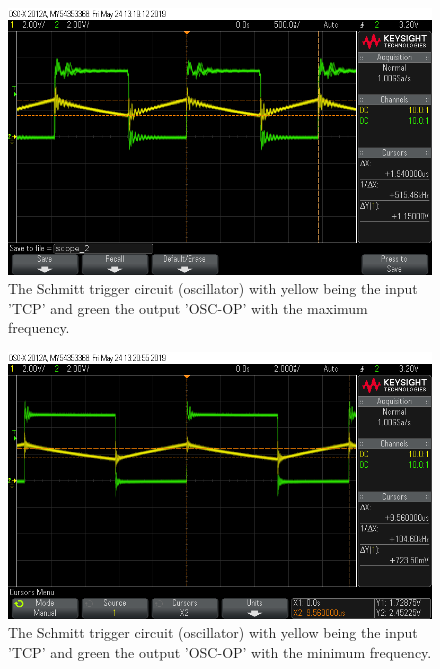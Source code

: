 \begin{figure}[H]
\centering
\includegraphics[width=.9\textwidth]{figures/scope_2.png}
\caption{The Schmitt trigger circuit (oscillator) with yellow being the input 'TCP' and green the output 'OSC-OP' with the maximum frequency.}
\label{fig:scope_2}
\end{figure}


\begin{figure}[H]
\centering
\includegraphics[width=.9\textwidth]{figures/scope_3.png}
\caption{The Schmitt trigger circuit (oscillator) with yellow being the input 'TCP' and green the output 'OSC-OP' with the minimum frequency.}
\label{fig:scope_3}
\end{figure}

